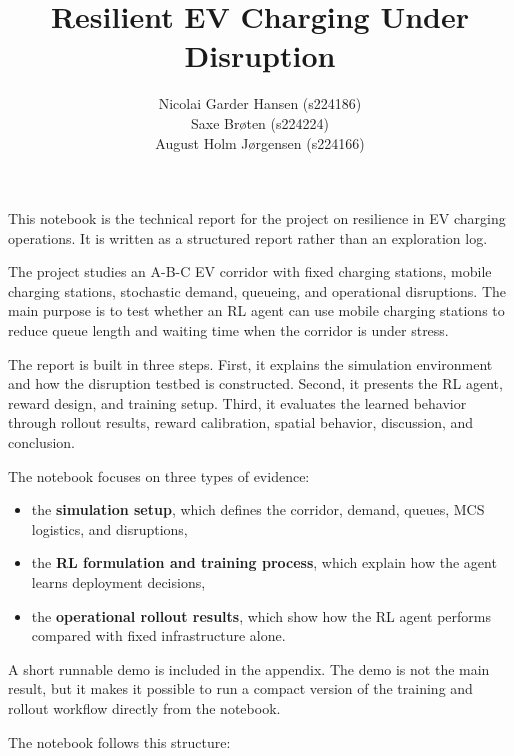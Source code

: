 \documentclass[11pt]{article}
\title{Resilient EV Charging Under Disruption}
\author{Nicolai Garder Hansen (s224186)\\Saxe Br\o ten (s224224)\\August Holm J\o rgensen (s224166)}
\date{}
\providecommand{\tightlist}{%
      \setlength{\itemsep}{0pt}\setlength{\parskip}{0pt}}
\begin{document}
    
    \maketitle
    
    
This notebook is the technical report for the project on resilience in
EV charging operations. It is written as a structured report rather than
an exploration log.

The project studies an A-B-C EV corridor with fixed charging stations,
mobile charging stations, stochastic demand, queueing, and operational
disruptions. The main purpose is to test whether an RL agent can use
mobile charging stations to reduce queue length and waiting time when
the corridor is under stress.

The report is built in three steps. First, it explains the simulation
environment and how the disruption testbed is constructed. Second, it
presents the RL agent, reward design, and training setup. Third, it
evaluates the learned behavior through rollout results, reward
calibration, spatial behavior, discussion, and conclusion.

The notebook focuses on three types of evidence:

\begin{itemize}
\tightlist
\item
  the \textbf{simulation setup}, which defines the corridor, demand,
  queues, MCS logistics, and disruptions,
\item
  the \textbf{RL formulation and training process}, which explain how
  the agent learns deployment decisions,
\item
  the \textbf{operational rollout results}, which show how the RL agent
  performs compared with fixed infrastructure alone.
\end{itemize}

A short runnable demo is included in the appendix. The demo is not the
main result, but it makes it possible to run a compact version of the
training and rollout workflow directly from the notebook.

The notebook follows this structure:
\end{document}
